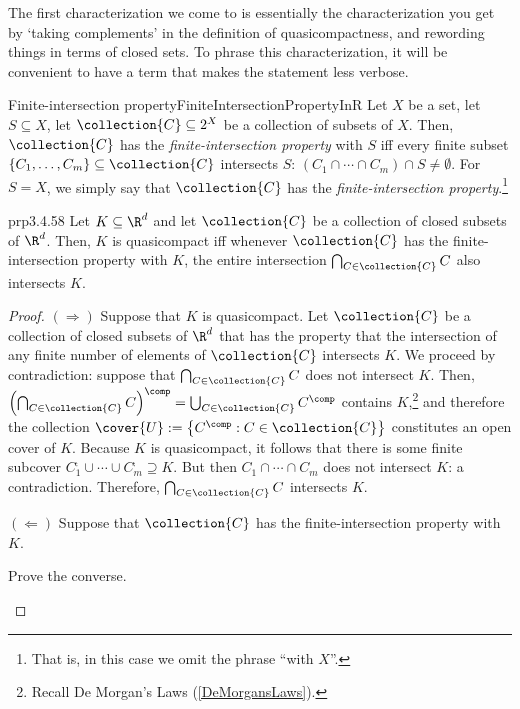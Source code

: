 The first characterization we come to is essentially the characterization you get by `taking complements' in the definition of quasicompactness, and rewording things in terms of closed sets.  To phrase this characterization, it will be convenient to have a term that makes the statement less verbose.
\begin{dfn}{Finite-intersection property}{FiniteIntersectionPropertyInR}
Let $X$ be a set, let $S\subseteq X$, let $\collection{C}\subseteq 2^X$ be a collection of subsets of $X$.  Then, $\collection{C}$ has the \emph{finite-intersection property} with $S$ iff every finite subset $\{ C_1,\ldots ,C_m\} \subseteq \collection{C}$ intersects $S$:  $(C_1\cap \cdots \cap C_m)\cap S\neq \emptyset$.  For $S=X$, we simply say that $\collection{C}$ has the \emph{finite-intersection property}.\footnote{That is, in this case we omit the phrase ``with $X$''.}
\end{dfn}
\begin{prp}{}{prp3.4.58}
Let $K\subseteq \R ^d$ and let $\collection{C}$ be a collection of closed subsets of $\R ^d$.  Then, $K$ is quasicompact iff whenever $\collection{C}$ has the finite-intersection property with $K$, the entire intersection $\bigcap _{C\in \collection{C}}C$ also intersects $K$.
\begin{proof}
$(\Rightarrow )$ Suppose that $K$ is quasicompact.  Let $\collection{C}$ be a collection of closed subsets of $\R ^d$ that has the property that the intersection of any finite number of elements of $\collection{C}$ intersects $K$.  We proceed by contradiction:  suppose that $\bigcap _{C\in \collection{C}}C$ does not intersect $K$.  Then, $\left( \bigcap _{C\in \collection{C}}C\right) ^{\comp}=\bigcup _{C\in \collection{C}}C^{\comp}$ contains $K$,\footnote{Recall De Morgan's Laws (\cref{DeMorgansLaws}).} and therefore the collection $\cover{U}:=\left\{ C^{\comp}:C\in \collection{C}\right\}$ constitutes an open cover of $K$.  Because $K$ is quasicompact, it follows that there is some finite subcover $C_1^{\comp}\cup \cdots \cup C_m^{\comp}\supseteq K$.  But then $C_1\cap \cdots \cap C_m$ does not intersect $K$:  a contradiction.  Therefore, $\bigcap _{C\in \collection{C}}C$ intersects $K$.

\blankline
\noindent
$(\Leftarrow )$ Suppose that $\collection{C}$ has the finite-intersection property with $K$.
\begin{exr}[breakable=false]{}{}
Prove the converse.
\end{exr}
\end{proof}
\end{prp}
